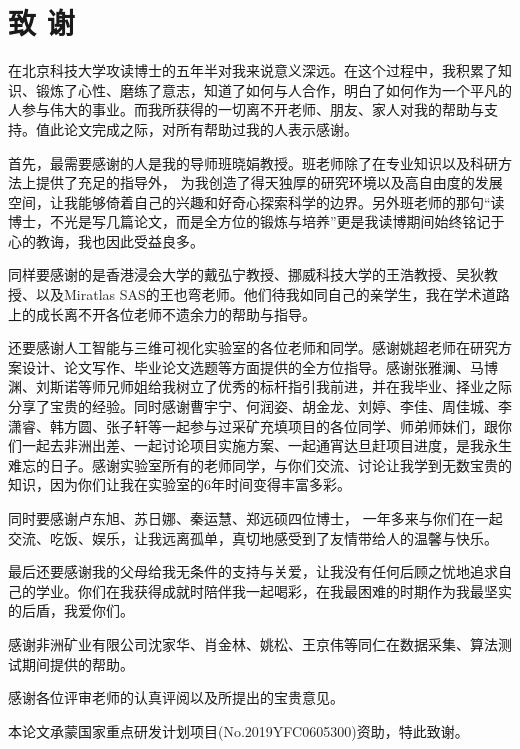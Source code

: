 
\chapter*{\centering  致 \space 谢}
在北京科技大学攻读博士的五年半对我来说意义深远。在这个过程中，我积累了知识、锻炼了心性、磨练了意志，知道了如何与人合作，明白了如何作为一个平凡的人参与伟大的事业。而我所获得的一切离不开老师、朋友、家人对我的帮助与支持。值此论文完成之际，对所有帮助过我的人表示感谢。

首先，最需要感谢的人是我的导师班晓娟教授。班老师除了在专业知识以及科研方法上提供了充足的指导外，
为我创造了得天独厚的研究环境以及高自由度的发展空间，让我能够倚着自己的兴趣和好奇心探索科学的边界。另外班老师的那句“读博士，不光是写几篇论文，而是全方位的锻炼与培养”更是我读博期间始终铭记于心的教诲，我也因此受益良多。

同样要感谢的是香港浸会大学的戴弘宁教授、挪威科技大学的王浩教授、吴狄教授、以及Miratlas SAS的王也弯老师。他们待我如同自己的亲学生，我在学术道路上的成长离不开各位老师不遗余力的帮助与指导。

还要感谢人工智能与三维可视化实验室的各位老师和同学。感谢姚超老师在研究方案设计、论文写作、毕业论文选题等方面提供的全方位指导。感谢张雅澜、马博渊、刘斯诺等师兄师姐给我树立了优秀的标杆指引我前进，并在我毕业、择业之际分享了宝贵的经验。同时感谢曹宇宁、何润姿、胡金龙、刘婷、李佳、周佳城、李潇睿、韩方圆、张子轩等一起参与过采矿充填项目的各位同学、师弟师妹们，跟你们一起去非洲出差、一起讨论项目实施方案、一起通宵达旦赶项目进度，是我永生难忘的日子。感谢实验室所有的老师同学，与你们交流、讨论让我学到无数宝贵的知识，因为你们让我在实验室的6年时间变得丰富多彩。

同时要感谢卢东旭、苏日娜、秦运慧、郑远硕四位博士，
一年多来与你们在一起交流、吃饭、娱乐，让我远离孤单，真切地感受到了友情带给人的温馨与快乐。

最后还要感谢我的父母给我无条件的支持与关爱，让我没有任何后顾之忧地追求自己的学业。你们在我获得成就时陪伴我一起喝彩，在我最困难的时期作为我最坚实的后盾，我爱你们。

感谢非洲矿业有限公司沈家华、肖金林、姚松、王京伟等同仁在数据采集、算法测试期间提供的帮助。

感谢各位评审老师的认真评阅以及所提出的宝贵意见。

本论文承蒙国家重点研发计划项目(No.2019YFC0605300)资助，特此致谢。



